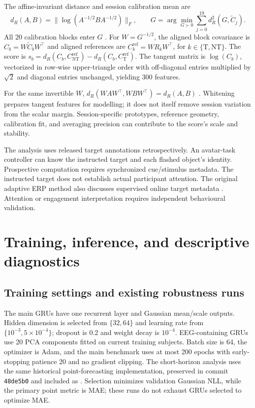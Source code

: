 \documentclass[a4paper,10pt,onecolumn]{IEEEtran}
\begin{document}
The affine-invariant distance and session calibration mean are
\begin{equation}
d_R(A,B)=\|\log(A^{-1/2}BA^{-1/2})\|_F,\qquad
G=\arg\min_{G\succ0}\sum_{j=0}^{19}d_R^2(G,\widetilde C_j).
\end{equation}
All 20 calibration blocks enter $G$ \cite{Moakher2005}.
For $W=G^{-1/2}$, the aligned block covariance is
$C_b=W\widetilde C_bW^\top$ and aligned references are
$C_k^{\mathrm{ref}}=WR_kW^\top$, for $k\in\{\mathrm T,\mathrm{NT}\}$.
The score is
$s_b=d_R(C_b,C_{\mathrm{NT}}^{\mathrm{ref}})
      -d_R(C_b,C_{\mathrm T}^{\mathrm{ref}})$.
The tangent matrix is $\log(C_b)$, vectorized in row-wise upper-triangle
order with off-diagonal entries multiplied by $\sqrt2$ and diagonal entries
unchanged, yielding 300 features.

For the same invertible $W$,
$d_R(WAW^\top,WBW^\top)=d_R(A,B)$ \cite{Congedo2017}.
Whitening prepares tangent features for modelling; it does not itself
remove session variation from the scalar margin. Session-specific
prototypes, reference geometry, calibration fit, and averaging precision
can contribute to the score's scale and stability.

The analysis uses released target annotations retrospectively. An avatar-task
controller can know the instructed target and each flashed object's identity.
Prospective computation requires synchronized cue/stimulus metadata.
The instructed target does not establish actual participant attention.
The original adaptive ERP method also discusses supervised online target
metadata \cite{Barachant2014}. Attention or engagement interpretation
requires independent behavioural validation.

\clearpage
\section{Training, inference, and descriptive diagnostics}

\subsection{Training settings and existing robustness runs}

The main GRUs have one recurrent layer and Gaussian mean/scale outputs.
Hidden dimension is selected from $\{32,64\}$ and learning rate from
$\{10^{-3},5\times10^{-4}\}$; dropout is 0.2 and weight decay is $10^{-4}$.
EEG-containing GRUs use 20 PCA components fitted on current training subjects.
Batch size is 64, the optimizer is Adam, and the main benchmark uses at most
200 epochs with early-stopping patience 20 and no gradient clipping.
The short-horizon analysis uses the same historical point-forecasting
implementation, preserved in commit \texttt{48de5b0} and included as
.
Selection minimizes validation Gaussian NLL, while the primary point metric
is MAE; these runs do not exhaust GRUs selected to optimize MAE.
\end{document}
